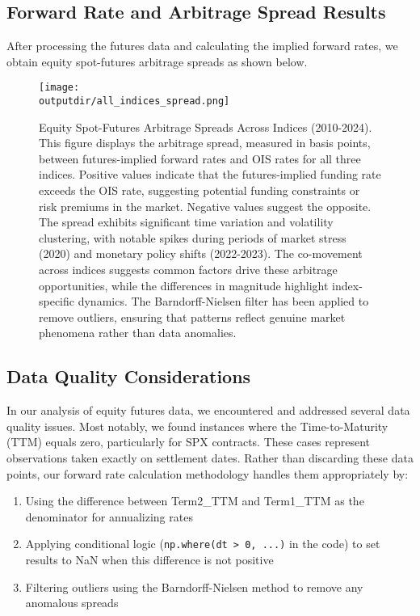 \documentclass{article}
\newcommand{\outputdir}{../_output}
\begin{document}
\subsection{Forward Rate and Arbitrage Spread Results}

After processing the futures data and calculating the implied forward rates, we obtain equity spot-futures arbitrage spreads as shown below.

\begin{figure}[H]
  \centering
  \texttt{[image: \\outputdir/all\_indices\_spread.png]}
  \caption{Equity Spot-Futures Arbitrage Spreads Across Indices (2010-2024). This figure displays the arbitrage spread, measured in basis points, between futures-implied forward rates and OIS rates for all three indices. Positive values indicate that the futures-implied funding rate exceeds the OIS rate, suggesting potential funding constraints or risk premiums in the market. Negative values suggest the opposite. The spread exhibits significant time variation and volatility clustering, with notable spikes during periods of market stress (2020) and monetary policy shifts (2022-2023). The co-movement across indices suggests common factors drive these arbitrage opportunities, while the differences in magnitude highlight index-specific dynamics. The Barndorff-Nielsen filter has been applied to remove outliers, ensuring that patterns reflect genuine market phenomena rather than data anomalies.}
  \label{fig:arbitrage_spreads}
\end{figure}

\subsection{Data Quality Considerations}

In our analysis of equity futures data, we encountered and addressed several data quality issues. Most notably, we found instances where the Time-to-Maturity (TTM) equals zero, particularly for SPX contracts. These cases represent observations taken exactly on settlement dates. Rather than discarding these data points, our forward rate calculation methodology handles them appropriately by:

\begin{enumerate}
  \item Using the difference between Term2\_TTM and Term1\_TTM as the denominator for annualizing rates
  \item Applying conditional logic (\texttt{np.where(dt > 0, ...)} in the code) to set results to NaN when this difference is not positive
  \item Filtering outliers using the Barndorff-Nielsen method to remove any anomalous spreads
\end{enumerate}
\end{document}
